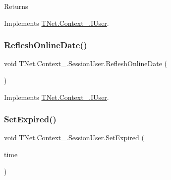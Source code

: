 \begin{DoxyReturn}{Returns}

\end{DoxyReturn}


Implements \mbox{\hyperlink{interface_t_net_1_1_context___1_1_i_user_a92f3fbefd7171a20797ea2115c1d3381}{T\+Net.\+Context\+\_\+.\+I\+User}}.

\mbox{\label{class_t_net_1_1_context___1_1_session_user_acfe0a90009a42462cb59b8963e703736}} 
\subsubsection{\texorpdfstring{Reflesh\+Online\+Date()}{RefleshOnlineDate()}}
{\footnotesize\ttfamily void T\+Net.\+Context\+\_\+.\+Session\+User.\+Reflesh\+Online\+Date (\begin{DoxyParamCaption}{ }\end{DoxyParamCaption})}







Implements \mbox{\hyperlink{interface_t_net_1_1_context___1_1_i_user_a7a87e43918c1415f2782cf201fb8228e}{T\+Net.\+Context\+\_\+.\+I\+User}}.

\mbox{\label{class_t_net_1_1_context___1_1_session_user_ad0987cd486a8ff474d73b9d9e40a9bf1}} 
\subsubsection{\texorpdfstring{Set\+Expired()}{SetExpired()}}
{\footnotesize\ttfamily void T\+Net.\+Context\+\_\+.\+Session\+User.\+Set\+Expired (\begin{DoxyParamCaption}\item[{Date\+Time}]{time }\end{DoxyParamCaption})}







